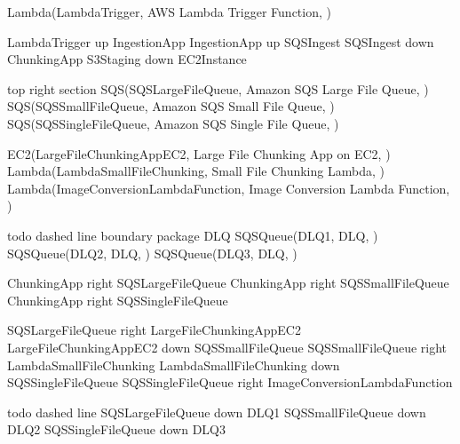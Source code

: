 \documentclass[letterpaper,10pt,english]{sphinxmanual}
\begin{document}
\begin{sphinxVerbatim}[commandchars=\\\{\},numbers=left,firstnumber=1,stepnumber=1]
Lambda(LambdaTrigger, \PYGZdq{}AWS Lambda Trigger Function\PYGZdq{}, \PYGZdq{} \PYGZdq{})

LambdaTrigger \PYGZhy{}up\PYGZhy{}\PYGZgt{} IngestionApp
IngestionApp \PYGZhy{}up\PYGZhy{}\PYGZgt{} SQSIngest
SQSIngest \PYGZhy{}down\PYGZhy{}\PYGZgt{} ChunkingApp
S3Staging \PYGZhy{}down\PYGZhy{}\PYGZgt{} EC2\PYGZus{}Instance

\PYGZsq{}top right section 
\PYGZsq{}\PYGZhy{}\PYGZhy{}\PYGZhy{}\PYGZhy{}\PYGZhy{}\PYGZhy{}\PYGZhy{}\PYGZhy{}\PYGZhy{}\PYGZhy{}\PYGZhy{}\PYGZhy{}\PYGZhy{}\PYGZhy{}\PYGZhy{}\PYGZhy{}\PYGZhy{}\PYGZhy{}\PYGZhy{}\PYGZhy{}\PYGZhy{}\PYGZhy{}\PYGZhy{}\PYGZhy{}\PYGZhy{}\PYGZhy{}\PYGZhy{}\PYGZhy{}\PYGZhy{}\PYGZhy{}\PYGZhy{}\PYGZhy{}\PYGZhy{}\PYGZhy{}\PYGZhy{}\PYGZhy{}\PYGZhy{}\PYGZhy{}\PYGZhy{}\PYGZhy{}\PYGZhy{}\PYGZhy{}\PYGZhy{}\PYGZhy{}\PYGZhy{}\PYGZhy{}\PYGZhy{}\PYGZhy{}\PYGZhy{}\PYGZhy{}\PYGZhy{}\PYGZhy{}\PYGZhy{}\PYGZhy{}\PYGZhy{}\PYGZhy{}\PYGZhy{}\PYGZhy{}\PYGZhy{}\PYGZhy{}\PYGZhy{}
SQS(SQSLargeFileQueue, \PYGZdq{}Amazon SQS Large File Queue\PYGZdq{}, \PYGZdq{} \PYGZdq{})
SQS(SQSSmallFileQueue, \PYGZdq{}Amazon SQS Small File Queue\PYGZdq{}, \PYGZdq{} \PYGZdq{})
SQS(SQSSingleFileQueue, \PYGZdq{}Amazon SQS Single File Queue\PYGZdq{}, \PYGZdq{} \PYGZdq{})

EC2(LargeFileChunkingAppEC2, \PYGZdq{}Large File Chunking App on EC2\PYGZdq{}, \PYGZdq{} \PYGZdq{})
Lambda(LambdaSmallFileChunking, \PYGZdq{}Small File Chunking Lambda\PYGZdq{}, \PYGZdq{} \PYGZdq{})
Lambda(ImageConversionLambdaFunction, \PYGZdq{}Image Conversion Lambda Function\PYGZdq{}, \PYGZdq{} \PYGZdq{})

\PYGZsq{}todo dashed line boundary
package DLQ \PYGZob{}
SQSQueue(DLQ1, \PYGZdq{}DLQ\PYGZdq{}, \PYGZdq{} \PYGZdq{})
SQSQueue(DLQ2, \PYGZdq{}DLQ\PYGZdq{}, \PYGZdq{} \PYGZdq{})
SQSQueue(DLQ3, \PYGZdq{}DLQ\PYGZdq{}, \PYGZdq{} \PYGZdq{})
\PYGZcb{}

ChunkingApp \PYGZhy{}right\PYGZhy{}\PYGZgt{} SQSLargeFileQueue
ChunkingApp \PYGZhy{}right\PYGZhy{}\PYGZgt{} SQSSmallFileQueue
ChunkingApp \PYGZhy{}right\PYGZhy{}\PYGZgt{} SQSSingleFileQueue

SQSLargeFileQueue \PYGZhy{}right\PYGZhy{}\PYGZgt{} LargeFileChunkingAppEC2
LargeFileChunkingAppEC2 \PYGZhy{}down\PYGZhy{}\PYGZgt{} SQSSmallFileQueue
SQSSmallFileQueue \PYGZhy{}right\PYGZhy{}\PYGZgt{} LambdaSmallFileChunking
LambdaSmallFileChunking \PYGZhy{}down\PYGZhy{}\PYGZgt{} SQSSingleFileQueue
SQSSingleFileQueue \PYGZhy{}right\PYGZhy{}\PYGZgt{} ImageConversionLambdaFunction

\PYGZsq{}todo dashed line
SQSLargeFileQueue \PYGZhy{}down\PYGZhy{}\PYGZgt{} DLQ1
SQSSmallFileQueue \PYGZhy{}down\PYGZhy{}\PYGZgt{} DLQ2
SQSSingleFileQueue \PYGZhy{}down\PYGZhy{}\PYGZgt{} DLQ3



\end{sphinxVerbatim}
\end{document}
